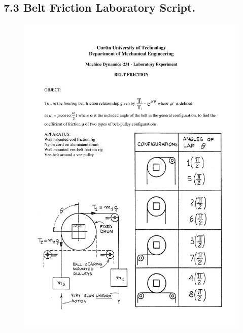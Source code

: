 \documentclass[12pt,a4paper]{report}
\begin{document}
\subsection*{7.3 Belt Friction Laboratory Script.}
\begin{figure}[H]
  \includegraphics[width=\linewidth]{lab2/lab2-1}
  \caption*{}
\label{}
\end{figure}
\end{document}
